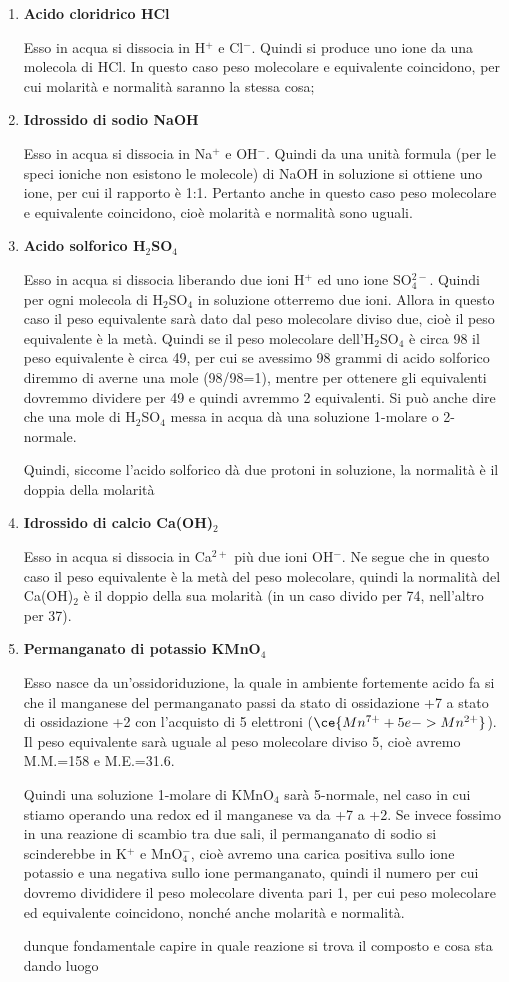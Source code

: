 \begin{enumerate}
    \item \textbf{Acido cloridrico HCl}
    
    Esso in acqua si dissocia in H$^+$ e Cl$^-$. Quindi si produce uno ione da una molecola di HCl. In questo caso peso molecolare e equivalente coincidono, per cui molarità e normalità saranno la stessa cosa;
    \item \textbf{Idrossido di sodio NaOH}
    
    Esso in acqua si dissocia in Na$^+$ e OH$^-$. Quindi da una unità formula (per le speci ioniche non esistono le molecole) di NaOH in soluzione si ottiene uno ione, per cui il rapporto è 1:1. Pertanto anche in questo caso peso molecolare e equivalente coincidono, cioè molarità e normalità sono uguali.
    \item \textbf{Acido solforico H$_2$SO$_4$}
    
    Esso in acqua si dissocia liberando due ioni H$^+$ ed uno ione SO$_4^{2-}$. Quindi per ogni molecola di H$_2$SO$_4$ in soluzione otterremo due ioni. Allora in questo caso il peso equivalente sarà dato dal peso molecolare diviso due, cioè il peso equivalente è la metà. Quindi se il peso molecolare dell'H$_2$SO$_4$ è circa 98 il peso equivalente è circa 49, per cui se avessimo 98 grammi di acido solforico diremmo di averne una mole (98/98=1), mentre per ottenere gli equivalenti dovremmo dividere per 49 e quindi avremmo 2 equivalenti. Si può anche dire che una mole di H$_2$SO$_4$ messa in acqua dà una soluzione 1-molare o 2-normale.

    Quindi, siccome l'acido solforico dà due protoni in soluzione, la normalità è il doppia della molarità
    \item \textbf{Idrossido di calcio Ca(OH)$_2$}
    
    Esso in acqua si dissocia in Ca$^{2+}$ più due ioni OH$^-$. Ne segue che in questo caso il peso equivalente è la metà del peso molecolare, quindi la normalità del Ca(OH)$_2$ è il doppio della sua molarità (in un caso divido per 74, nell'altro per 37).
    \item \textbf{Permanganato di potassio KMnO$_4$}
    
    Esso nasce da un'ossidoriduzione, la quale in ambiente fortemente acido fa si che il manganese del permanganato passi da stato di ossidazione +7 a stato di ossidazione +2 con l'acquisto di 5 elettroni ($\ce{Mn^{7+} + 5e -> Mn^{2+}}$). Il peso equivalente sarà uguale al peso molecolare diviso 5, cioè avremo M.M.=158 e M.E.=31.6.

    Quindi una soluzione 1-molare di KMnO$_4$ sarà 5-normale, nel caso in cui stiamo operando una redox ed il manganese va da +7 a +2. Se invece fossimo in una reazione di scambio tra due sali, il permanganato di sodio si scinderebbe in K$^+$ e MnO$_4^-$, cioè avremo una carica positiva sullo ione potassio e una negativa sullo ione permanganato, quindi il numero per cui dovremo divididere il peso molecolare diventa pari 1, per cui peso molecolare ed equivalente coincidono, nonché anche molarità e normalità.

    \E dunque fondamentale capire in quale reazione si trova il composto e cosa sta dando luogo
\end{enumerate}
